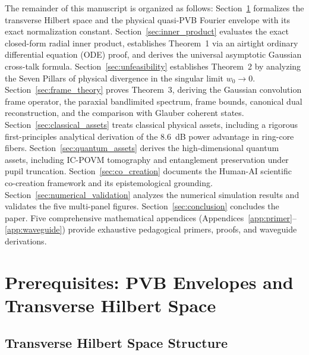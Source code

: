 \documentclass{optica-article}
\begin{document}
The remainder of this manuscript is organized as follows: Section~\ref{sec:prerequisites} formalizes the transverse Hilbert space and the physical quasi-PVB Fourier envelope with its exact normalization constant. Section~\ref{sec:inner_product} evaluates the exact closed-form radial inner product, establishes Theorem~1 via an airtight ordinary differential equation (ODE) proof, and derives the universal asymptotic Gaussian cross-talk formula. Section~\ref{sec:unfeasibility} establishes Theorem~2 by analyzing the Seven Pillars of physical divergence in the singular limit $w_0 \to 0$. Section~\ref{sec:frame_theory} proves Theorem~3, deriving the Gaussian convolution frame operator, the paraxial bandlimited spectrum, frame bounds, canonical dual reconstruction, and the comparison with Glauber coherent states. Section~\ref{sec:classical_assets} treats classical physical assets, including a rigorous first-principles analytical derivation of the 8.6~dB power advantage in ring-core fibers. Section~\ref{sec:quantum_assets} derives the high-dimensional quantum assets, including IC-POVM tomography and entanglement preservation under pupil truncation. Section~\ref{sec:co_creation} documents the Human-AI scientific co-creation framework and its epistemological grounding. Section~\ref{sec:numerical_validation} analyzes the numerical simulation results and validates the five multi-panel figures. Section~\ref{sec:conclusion} concludes the paper. Five comprehensive mathematical appendices (Appendices~\ref{app:primer}--\ref{app:waveguide}) provide exhaustive pedagogical primers, proofs, and waveguide derivations.

\section{Prerequisites: PVB Envelopes and Transverse Hilbert Space}
\label{sec:prerequisites}

\subsection{Transverse Hilbert Space Structure}
\end{document}
